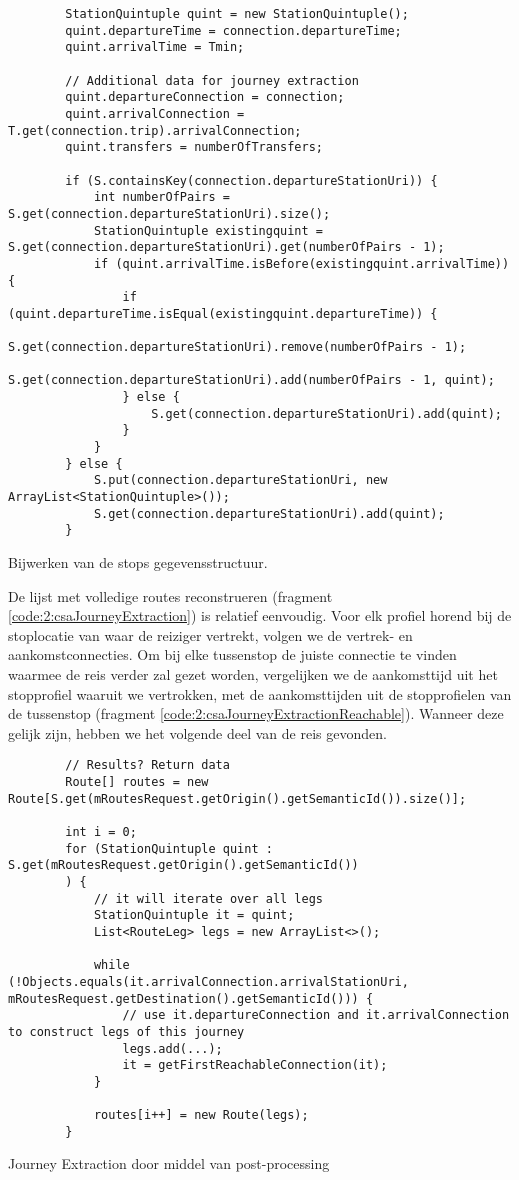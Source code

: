 \begin{code}
	\begin{verbatim}
		StationQuintuple quint = new StationQuintuple();
		quint.departureTime = connection.departureTime;
		quint.arrivalTime = Tmin;
		
		// Additional data for journey extraction
		quint.departureConnection = connection;
		quint.arrivalConnection = T.get(connection.trip).arrivalConnection;
		quint.transfers = numberOfTransfers;
		
		if (S.containsKey(connection.departureStationUri)) {
			int numberOfPairs = S.get(connection.departureStationUri).size();
			StationQuintuple existingquint = S.get(connection.departureStationUri).get(numberOfPairs - 1);
			if (quint.arrivalTime.isBefore(existingquint.arrivalTime)) {
				if (quint.departureTime.isEqual(existingquint.departureTime)) {
					S.get(connection.departureStationUri).remove(numberOfPairs - 1);
					S.get(connection.departureStationUri).add(numberOfPairs - 1, quint);
				} else {
					S.get(connection.departureStationUri).add(quint);
				}
			}
		} else {
			S.put(connection.departureStationUri, new ArrayList<StationQuintuple>());
			S.get(connection.departureStationUri).add(quint);
		}
	\end{verbatim}
	\caption[CSA: Bijwerken S]{Bijwerken van de stops gegevensstructuur.}
	\label{code:2:csaS}
\end{code}
De lijst met volledige routes reconstrueren (fragment \ref{code:2:csaJourneyExtraction}) is relatief eenvoudig. Voor elk profiel horend bij de stoplocatie van waar de reiziger vertrekt, volgen we de vertrek- en aankomstconnecties. Om bij elke tussenstop de juiste connectie te vinden waarmee de reis verder zal gezet worden, vergelijken we de aankomsttijd uit het stopprofiel waaruit we vertrokken, met de aankomsttijden uit de stopprofielen van de tussenstop (fragment \ref{code:2:csaJourneyExtractionReachable}). Wanneer deze gelijk zijn, hebben we het volgende deel van de reis gevonden.
\begin{code}
	\begin{verbatim}
		// Results? Return data
		Route[] routes = new Route[S.get(mRoutesRequest.getOrigin().getSemanticId()).size()];
		
		int i = 0;
		for (StationQuintuple quint : S.get(mRoutesRequest.getOrigin().getSemanticId())
		) {
			// it will iterate over all legs
			StationQuintuple it = quint;
			List<RouteLeg> legs = new ArrayList<>();
			
			while (!Objects.equals(it.arrivalConnection.arrivalStationUri, mRoutesRequest.getDestination().getSemanticId())) {
				// use it.departureConnection and it.arrivalConnection to construct legs of this journey
				legs.add(...);
				it = getFirstReachableConnection(it);
			}
			
			routes[i++] = new Route(legs);
		}
	\end{verbatim}
	\caption[CSA: Journey extraction]{Journey Extraction door middel van post-processing}
	\label{code:2:csaJourneyExtraction}
\end{code}
